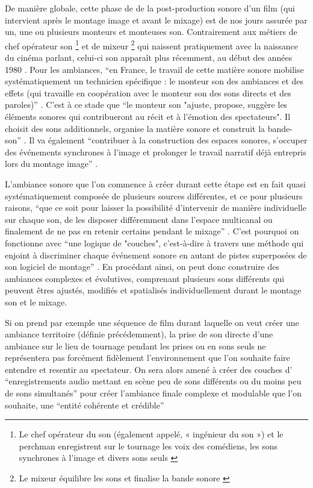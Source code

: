 ﻿\documentclass[12pt]{article}
\begin{document}
De manière globale, cette phase de de la post-production sonore d'un film (qui intervient après le montage image et avant le mixage) est de nos jours assurée par un, une ou plusieurs monteurs et monteuses son. Contrairement aux métiers de chef opérateur son \footnote{Le chef opérateur du son (également appelé, « ingénieur du son ») et le perchman  enregistrent sur le tournage les voix des comédiens, les sons synchrones à l'image  et divers sons seuls \parencite{denizart_lemergence_2017}} et de mixeur \footnote{Le mixeur équilibre les sons et finalise la bande sonore \parencite{denizart_lemergence_2017}} qui naissent pratiquement avec la naissance du cinéma parlant, celui-ci son apparaît plus récemment, au début des années 1980 \parencite{denizart_lemergence_2017}. Pour les ambiances, \enquote{en France, le travail de cette matière sonore mobilise systématiquement un technicien spécifique : le monteur son des ambiances et des effets (qui travaille en coopération avec le monteur son des sons directs et des paroles)} \parencite{adjiman_usages_2018}. C'est à ce stade que \enquote{le monteur son "ajuste, propose, suggère les éléments sonores qui contribueront  au récit et à l'émotion des spectateurs". Il choisit des sons additionnels, organise la matière sonore et construit la bande-son} \parencite{denizart_lemergence_2017}. Il va également \enquote{contribuer à la construction des espaces sonores, s’occuper des  événements synchrones à l’image et prolonger le travail narratif déjà entrepris lors  du montage image} \parencite{denizart_lemergence_2017}.

\leavevmode

L'ambiance sonore que l'on commence à créer durant cette étape est en fait quasi systématiquement composée de plusieurs sources différentes, et ce pour plusieurs raisons, \enquote{que ce soit pour laisser la possibilité d'intervenir de manière individuelle sur chaque son, de les disposer différemment dans l'espace multicanal ou finalement de ne pas en retenir certains pendant le mixage} \parencite{adjiman_pour_2015}. C'est pourquoi on fonctionne avec \enquote{une logique de "couches", c'est-à-dire à travers une méthode qui enjoint à discriminer chaque événement sonore en autant de pistes superposées de son logiciel de montage} \parencite{adjiman_pour_2015}. En procédant ainsi, on peut donc construire des ambiances complexes et évolutives, comprenant plusieurs sons différents qui peuvent êtres ajustés, modifiés et spatialisés individuellement durant le montage son et le mixage.

Si on prend par exemple une séquence de film durant laquelle on veut créer une ambiance territoire (définie précédemment), la prise de son directe d'une ambiance sur le lieu de tournage pendant les prises ou en sons seuls ne représentera pas forcément fidèlement l'environnement que l'on souhaite faire entendre et resentir au spectateur. On sera alors amené à créer des couches d' \enquote{enregistrements audio mettant en scène peu de sons différents ou du moins peu de sons simultanés} \parencite{adjiman_pour_2015} pour créer l'ambiance finale complexe et modulable que l'on souhaite, une \enquote{entité cohérente et crédible} \parencite{adjiman_pour_2015}
\end{document}
